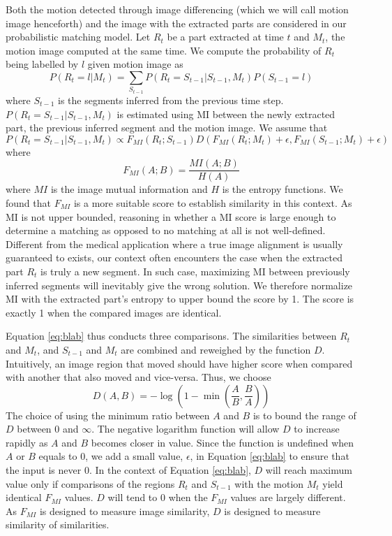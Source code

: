 \documentclass{article}
\begin{document}
Both the motion detected through image differencing (which we will call motion image henceforth) and the image with the extracted parts are considered in our probabilistic matching model. Let $R_t$ be a part extracted at time $t$ and $M_t$, the motion image computed at the same time. We compute the probability of $R_t$ being labelled by $l$ given motion image as
\begin{equation}
	P(R_t = l | M_t) = \sum_{S_{t-1}} P(R_t = S_{t-1} | S_{t-1}, M_t)P(S_{t-1} = l)
\end{equation}
where $S_{t-1}$ is the segments inferred from the previous time step. $P(R_t = S_{t-1} | S_{t-1}, M_t)$ is estimated using MI between the newly extracted part, the previous inferred segment and the motion image. We assume that 
\begin{equation}\label{eq:blab}
	P(R_t = S_{t-1} | S_{t-1}, M_t) \propto F_{MI}(R_t; S_{t-1})D(F_{MI}(R_t; M_t) + \epsilon, F_{MI}(S_{t-1}; M_t) + \epsilon)
\end{equation}
where
\begin{equation}
	F_{MI}(A;B) = \frac{MI(A;B)}{H(A)}
\end{equation}
where $MI$ is the image mutual information and $H$ is the entropy functions. We found that $F_{MI}$ is a more suitable score to establish similarity in this context. As MI is not upper bounded, reasoning in whether a MI score is large enough to determine a matching as opposed to no matching at all is not well-defined. Different from the medical application where a true image alignment is usually guaranteed to exists, our context often encounters the case when the extracted part $R_t$ is truly a new segment. In such case, maximizing MI between previously inferred segments will inevitably give the wrong solution. We therefore normalize MI with the extracted part's entropy to upper bound the score by 1. The score is exactly 1 when the compared images are identical. 

Equation \ref{eq:blab} thus conducts three comparisons. The similarities between $R_t$ and $M_t$, and $S_{t-1}$ and $M_t$ are combined and reweighed by the function $D$. Intuitively, an image region that moved should have higher score when compared with another that also moved and vice-versa. Thus, we choose
\begin{equation}
	D(A,B) = -\log\left(1-\min\left(\frac{A}{B}, \frac{B}{A}\right)\right)
\end{equation}
The choice of using the minimum ratio between $A$ and $B$ is to bound the range of $D$ between $0$ and $\infty$. The negative logarithm function will allow $D$ to increase rapidly as $A$ and $B$ becomes closer in value. Since the function is undefined when $A$ or $B$ equals to 0, we add a small value, $\epsilon$, in Equation \ref{eq:blab} to ensure that the input is never 0. In the context of Equation \ref{eq:blab}, $D$ will reach maximum value only if comparisons of the regions $R_t$ and $S_{t-1}$ with the motion $M_t$ yield identical $F_{MI}$ values. $D$ will tend to 0 when the $F_{MI}$ values are largely different. As $F_{MI}$ is designed to measure image similarity, $D$ is designed to measure similarity of similarities.
\end{document}
